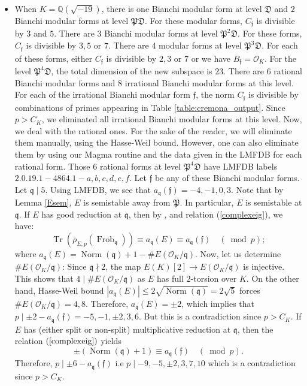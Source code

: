 \documentclass[]{article}
\newcommand {\QQ}{{\mathbb{Q}}}
\newcommand {\mcalO}{{\mathcal{O}}}
\newcommand {\mfp}{{\mathfrak{P}}}
\DeclareMathOperator{\Norm}{Norm}
\begin{document}
\begin{itemize}
    \item When $K=\QQ(\sqrt{-19})$, there is one Bianchi modular form at level $\mathfrak{D}$ and $2$ Bianchi modular forms at level $\mfp\mathfrak{D}$. For these modular forms, $C_{\mathfrak{f}}$ is divisible by $3$ and $5$. There are $3$ Bianchi modular forms at level $\mfp^2\mathfrak{D}$. For these forms, $C_{\mathfrak{f}}$ is divisible by $3,5$ or $7$. There are $4$ modular forms at level $\mfp^3\mathfrak{D}$. For each of these forms, either $C_{\mathfrak{f}}$ is divisible by $2,3$ or $7$ or we have $B_{\mathfrak{f}}=\mcalO_K$. For the level $\mfp^4\mathfrak{D}$, the total dimension of the new subspace is $23$. There are $6$ rational Bianchi modular forms and $8$ irrational Bianchi modular forms at this level. For each of the irrational Bianchi modular form $\mathfrak{f}$, the norm $C_{\mathfrak{f}}$ is divisible by combinations of primes appearing in Table \ref{table:cremona_output}. Since $p>C_K$, we eliminated all irrational Bianchi modular forms at this level. Now, we deal with the rational ones. For the sake of the reader, we will eliminate them manually, using the Hasse-Weil bound. However, one can also eliminate them by using our Magma routine and the data given in the LMFDB for each rational form. Those $6$ rational forms at level $\mfp^4\mathfrak{D}$ have LMFDB labels $2.0.19.1-4864.1-a,b,c,d,e,f$. Let $\mathfrak{f}$ be any of these Bianchi modular forms. Let $\mathfrak{q}\mid 5$. Using LMFDB, we see that $a_\mathfrak{q}(\mathfrak{f})=-4,-1,0,3$. Note that by Lemma \ref{Esem}, $E$ is semistable away from $\mfp$. In particular, $E$ is semistable at $\mathfrak{q}$. If $E$ has good reduction at $\mathfrak{q}$, then by \cite[Theorem V.2.3.1(b)]{silverman2009arithmetic}, and relation (\ref{complexeig}), we have:
$$
\operatorname{Tr}\left(\bar{\rho}_{E, p}\left(\operatorname{Frob}_{\mathfrak{q}}\right)\right) \equiv a_{\mathfrak{q}}(E)\equiv a_{\mathfrak{q}}(\mathfrak{f}) \quad(\bmod p);
$$where $a_{\mathfrak{q}}(E)=\Norm(\mathfrak{q})+1-\#E\left(\mcalO_K/\mathfrak{q}\right)$. Now, let us determine $\#E\left(\mcalO_K/\mathfrak{q}\right)$: Since $\mathfrak{q}\nmid 2$, the map $E(K)[2]\to E\left(\mcalO_K/\mathfrak{q}\right)$ is injective. This shows that $4\mid \#E\left(\mcalO_K/\mathfrak{q}\right)$ as $E$ has full $2$-torsion over $K$. On the other hand, Hasse-Weil bound $|a_{\mathfrak{q}}(E)|\le 2\sqrt{\Norm(\mathfrak{q})}=2\sqrt{5}$ forces $\#E\left(\mcalO_K/\mathfrak{q}\right)=4,8$. Therefore, $a_{\mathfrak{q}}(E)=\pm 2$, which implies that $p\mid \pm2 -a_{\mathfrak{q}}(\mathfrak{f})=-5,-1,\pm 2,3,6$. But this is a contradiction since $p>C_K$. If $E$ has (either split or non-split) multiplicative reduction at $\mathfrak{q}$, then the relation $(\ref{complexeig})$ yields
$$\pm (\Norm(\mathfrak{q})+1)\equiv a_{\mathfrak{q}}(\mathfrak{f}) \quad(\bmod p).$$Therefore, $p\mid \pm6-a_{\mathfrak{q}}(\mathfrak{f})$ i.e $p\mid -9,-5,\pm2,3,7,10$ which is a contradiction since $p>C_K$. 
    

\end{itemize}
\end{document}
